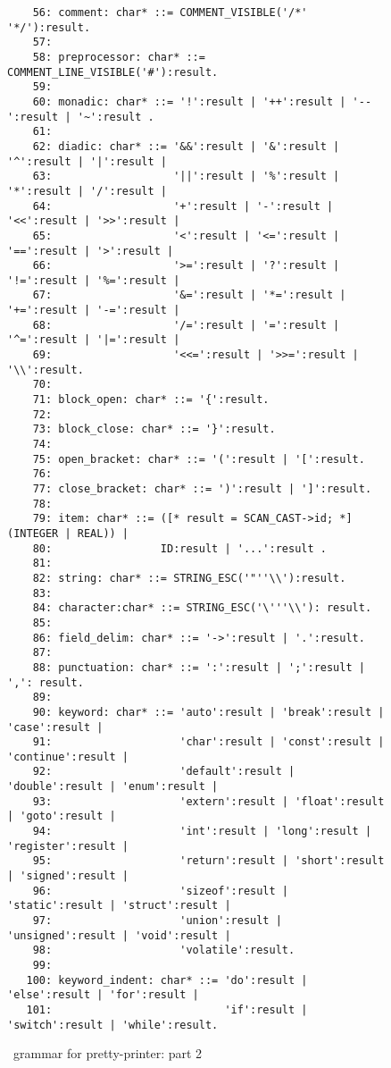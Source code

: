 \begin{figure}
\hspace*{-1cm}
\begin{minipage}{30cm}
\footnotesize
\begin{verbatim}
    56: comment: char* ::= COMMENT_VISIBLE('/*' '*/'):result.
    57: 
    58: preprocessor: char* ::= COMMENT_LINE_VISIBLE('#'):result.
    59: 
    60: monadic: char* ::= '!':result | '++':result | '--':result | '~':result .
    61: 
    62: diadic: char* ::= '&&':result | '&':result | '^':result | '|':result |
    63:                   '||':result | '%':result | '*':result | '/':result |
    64:                   '+':result | '-':result | '<<':result | '>>':result |
    65:                   '<':result | '<=':result | '==':result | '>':result |
    66:                   '>=':result | '?':result | '!=':result | '%=':result |
    67:                   '&=':result | '*=':result | '+=':result | '-=':result |
    68:                   '/=':result | '=':result | '^=':result | '|=':result |
    69:                   '<<=':result | '>>=':result | '\\':result.
    70: 
    71: block_open: char* ::= '{':result.
    72: 
    73: block_close: char* ::= '}':result.
    74: 
    75: open_bracket: char* ::= '(':result | '[':result.
    76: 
    77: close_bracket: char* ::= ')':result | ']':result.
    78: 
    79: item: char* ::= ([* result = SCAN_CAST->id; *] (INTEGER | REAL)) |
    80:                 ID:result | '...':result .
    81: 
    82: string: char* ::= STRING_ESC('"''\\'):result.
    83: 
    84: character:char* ::= STRING_ESC('\'''\\'): result.
    85: 
    86: field_delim: char* ::= '->':result | '.':result.
    87: 
    88: punctuation: char* ::= ':':result | ';':result | ',': result.
    89: 
    90: keyword: char* ::= 'auto':result | 'break':result | 'case':result |
    91:                    'char':result | 'const':result | 'continue':result |
    92:                    'default':result | 'double':result | 'enum':result |
    93:                    'extern':result | 'float':result | 'goto':result |
    94:                    'int':result | 'long':result | 'register':result |
    95:                    'return':result | 'short':result | 'signed':result |
    96:                    'sizeof':result | 'static':result | 'struct':result |
    97:                    'union':result | 'unsigned':result | 'void':result |
    98:                    'volatile':result.
    99: 
   100: keyword_indent: char* ::= 'do':result | 'else':result | 'for':result |
   101:                           'if':result | 'switch':result | 'while':result.
\end{verbatim}
\end{minipage}
\caption{\rdp\ grammar for pretty-printer: part 2}
\label{pretty_c.bnf:2}
\end{figure}

